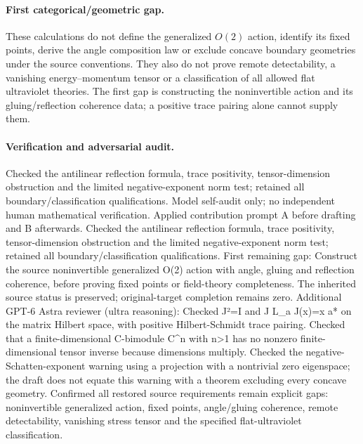 \documentclass[11pt]{article}
\begin{document}
\paragraph{First categorical/geometric gap.} These calculations do not define the generalized \(O(2)\) action, identify its fixed points, derive the angle composition law or exclude concave boundary geometries under the source conventions. They also do not prove remote detectability, a vanishing energy--momentum tensor or a classification of all allowed flat ultraviolet theories. The first gap is constructing the noninvertible action and its gluing/reflection coherence data; a positive trace pairing alone cannot supply them.

\paragraph{Verification and adversarial audit.}
Checked the antilinear reflection formula, trace positivity, tensor-dimension obstruction and the limited negative-exponent norm test; retained all boundary/classification qualifications. Model self-audit only; no independent human mathematical verification. Applied contribution prompt A before drafting and B afterwards. Checked the antilinear reflection formula, trace positivity, tensor-dimension obstruction and the limited negative-exponent norm test; retained all boundary/classification qualifications. First remaining gap: Construct the source noninvertible generalized O(2) action with angle, gluing and reflection coherence, before proving fixed points or field-theory completeness. The inherited source status is preserved; original-target completion remains zero. Additional GPT-6 Astra reviewer (ultra reasoning): Checked J²=I and J L\_a J(x)=x a* on the matrix Hilbert space, with positive Hilbert-Schmidt trace pairing. Checked that a finite-dimensional C-bimodule C\textasciicircum{}n with n>1 has no nonzero finite-dimensional tensor inverse because dimensions multiply. Checked the negative-Schatten-exponent warning using a projection with a nontrivial zero eigenspace; the draft does not equate this warning with a theorem excluding every concave geometry. Confirmed all restored source requirements remain explicit gaps: noninvertible generalized action, fixed points, angle/gluing coherence, remote detectability, vanishing stress tensor and the specified flat-ultraviolet classification.
\end{document}
